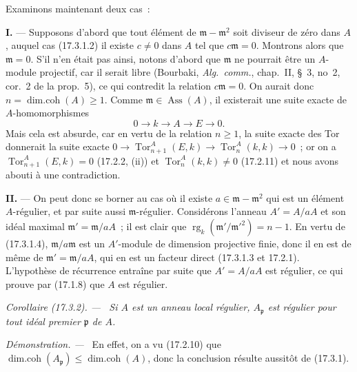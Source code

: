\documentclass[10pt,oneside]{book}
\makeatletter
\newcommand{\setmanualcurrentlabel}[1]{\def\@currentlabel{#1}}
\newcommand{\oldpage}[2][]{%
  \setcounter{footnote}{0}%
  \marginpar{\scriptsize\textbf{#1}~|~#2}\ignorespaces}
\newenvironment{corollary}[1][]{%
  \setmanualcurrentlabel{#1}\par\medskip\noindent\itshape Corollaire (#1). ---\ }{\par}
\newenvironment{proof}{%
  \par\medskip\noindent\textit{Démonstration. ---\ }}{\par}
\makeatother
\begin{document}
Examinons maintenant deux cas~:

\medskip\noindent\textbf{I.} --- Supposons d'abord que tout élément de
$\mathfrak{m}-\mathfrak{m}^2$ soit diviseur de zéro dans $A$, auquel cas
(17.3.1.2) il existe $c\neq0$ dans $A$ tel que $c\mathfrak{m}=0$. Montrons
alors que $\mathfrak{m}=0$. S'il n'en était pas ainsi, notons d'abord que
$\mathfrak{m}$ ne pourrait être un $A$-module projectif, car il serait libre
(Bourbaki, \emph{Alg.~comm.}, chap.~II, \S~3, no~2, cor.~2 de la prop.~5),
ce qui contredit la relation $c\mathfrak{m}=0$. On aurait donc
$n=\operatorname{dim.coh}(A)\geq1$. Comme
$\mathfrak{m}\in\operatorname{Ass}(A)$, il existerait une suite exacte de
$A$-homomorphismes
\[
  0\longrightarrow k\longrightarrow A\longrightarrow E\longrightarrow0.
\]
Mais cela est absurde, car en vertu de la relation $n\geq1$, la suite exacte
des Tor donnerait la suite exacte
$0\longrightarrow\operatorname{Tor}^A_{n+1}(E,k)\longrightarrow
\operatorname{Tor}^A_n(k,k)\longrightarrow0$~; or on a
$\operatorname{Tor}^A_{n+1}(E,k)=0$ (17.2.2, (ii)) et
$\operatorname{Tor}^A_n(k,k)\neq0$ (17.2.11) et nous avons abouti à une
contradiction.

\medskip\noindent\textbf{II.} --- On peut donc se borner au cas où il existe
$a\in\mathfrak{m}-\mathfrak{m}^2$ qui est un élément $A$-régulier, et par
suite aussi $\mathfrak{m}$-régulier. Considérons l'anneau $A'=A/aA$ et son
idéal
\oldpage[0\textsubscript{IV-1}]{48}
maximal $\mathfrak{m}'=\mathfrak{m}/aA$~; il est clair que
$\operatorname{rg}_k(\mathfrak{m}'/\mathfrak{m}'^2)=n-1$. En vertu de
(17.3.1.4), $\mathfrak{m}/a\mathfrak{m}$ est un $A'$-module de dimension
projective finie, donc il en est de même de
$\mathfrak{m}'=\mathfrak{m}/aA$, qui en est un facteur direct (17.3.1.3 et
17.2.1). L'hypothèse de récurrence entraîne par suite que $A'=A/aA$ est
régulier, ce qui prouve par (17.1.8) que $A$ est régulier.

\begin{corollary}[17.3.2]
\label{0.17.3.2-fr}
Si $A$ est un anneau local régulier, $A_{\mathfrak{p}}$ est régulier pour tout
idéal premier $\mathfrak{p}$ de $A$.
\end{corollary}

\begin{proof}
En effet, on a vu (17.2.10) que
$\operatorname{dim.coh}(A_{\mathfrak{p}})\leq
\operatorname{dim.coh}(A)$, donc la conclusion résulte aussitôt de (17.3.1).
\end{proof}
\end{document}
